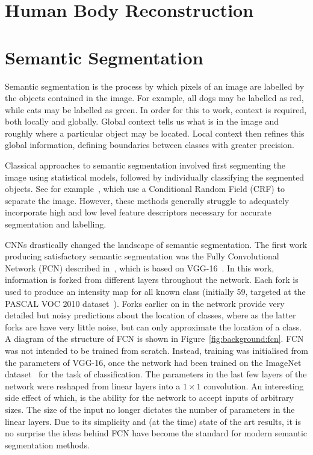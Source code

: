 \section{Human Body Reconstruction}




\section{Semantic Segmentation}

Semantic segmentation is the process by which pixels of an image are
labelled by the objects contained in the image. For example, all dogs
may be labelled as red, while cats may be labelled as green. In order
for this to work, context is required, both locally and
globally. Global context tells us what is in the image and roughly
where a particular object may be located. Local context then refines
this global information, defining boundaries between classes with
greater precision.

Classical approaches to semantic segmentation involved first
segmenting the image using statistical models, followed by
individually classifying the segmented objects. See for
example~\cite{arbelaez2012semantic,carreira2012semantic}, which use a
Conditional Random Field (CRF) to separate the image. However, these
methods generally struggle to adequately incorporate high and low
level feature descriptors necessary for accurate segmentation and
labelling.

CNNs drastically changed the landscape of semantic segmentation. The
first work producing satisfactory semantic segmentation was the Fully
Convolutional Network (FCN) described in~\cite{long2015fully}, which
is based on VGG-16~\cite{simonyan2014vgg}. In this work, information
is forked from different layers throughout the network. Each fork is
used to produce an intensity map for all known class (initially 59,
targeted at the PASCAL VOC 2010
dataset~\cite{everingham2010pascal}). Forks earlier on in the network
provide very detailed but noisy predictions about the location of
classes, where as the latter forks are have very little noise, but can
only approximate the location of a class. A diagram of the structure
of FCN is shown in Figure~\ref{fig:background:fcn}. FCN was not
intended to be trained from scratch. Instead, training was initialised
from the parameters of VGG-16, once the network had been trained on
the ImageNet dataset~\cite{krizhevsky2012imagenet} for the task of
classification. The parameters in the last few layers of the network
were reshaped from linear layers into a $1\times 1$ convolution. An
interesting side effect of which, is the ability for the network to
accept inputs of arbitrary sizes. The size of the input no longer
dictates the number of parameters in the linear layers. Due to its
simplicity and (at the time) state of the art results, it is no
surprise the ideas behind FCN have become the standard for modern
semantic segmentation methods.


